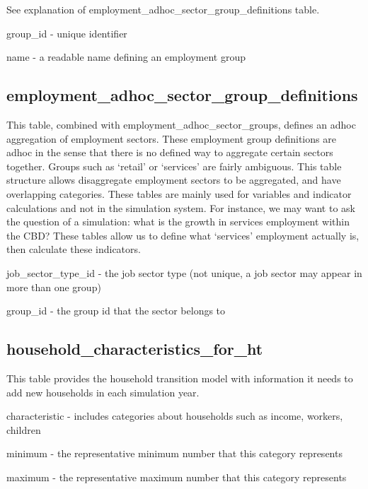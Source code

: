 See explanation of employment\_adhoc\_sector\_group\_definitions table.

\begin{description}
\item group\_id - unique identifier
\item name - a readable name defining an employment group 
\end{description}

\subsection{employment\_adhoc\_sector\_group\_definitions} 

This table, combined with employment\_adhoc\_sector\_groups, defines an adhoc aggregation of employment sectors. These employment group definitions are adhoc in the sense that there is no defined way to aggregate certain sectors together. Groups such as `retail' or `services' are fairly ambiguous. This table structure allows disaggregate employment sectors to be aggregated, and have overlapping categories. These tables are mainly used for variables and indicator calculations and not in the simulation system. For instance, we may want to ask the question of a simulation: what is the growth in services employment within the CBD? These tables allow us to define what `services' employment actually is, then calculate these indicators.

\begin{description}
\item job\_sector\_type\_id - the job sector type (not unique, a job sector may appear in more than one group)
\item group\_id - the group id that the sector belongs to 
\end{description}

\subsection{household\_characteristics\_for\_ht} 

This table provides the household transition model with information it needs to add new households in each simulation year.

\begin{description}
\item characteristic - includes categories about households such as income, workers, children
\item minimum - the representative minimum number that this category represents
\item maximum - the representative maximum number that this category represents 
\end{description}

